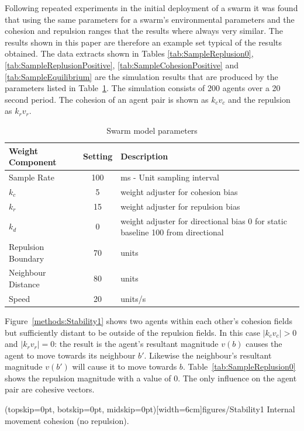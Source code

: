 \documentclass{ieeeaccess}
\begin{document}
Following repeated experiments in the initial deployment of a swarm it was
found that using the same parameters for a swarm's environmental parameters and
the cohesion and repulsion ranges that the results where always very similar.
The results shown in this paper are therefore an example set typical of the
results obtained. The data extracts shown in Tables \ref{tab:SampleReplusion0},
\ref{tab:SampleReplusionPositive}, \ref{tab:SampleCohesionPositive} and
\ref{tab:SampleEquilibrium} are the simulation results that are produced by the
parameters listed in Table~\ref{tab:MetricPhysics1}. The simulation consists of
200 agents over a 20 second period. The cohesion of an agent pair is shown as
$k_cv_c$ and the repulsion as $k_rv_r$.

\begin{table}[H]
\begin{center}
\begin{tabular}{| p{2.5cm} | c | p{3cm} |}
\hline
\bf Weight \bf Component & \bf Setting & \bf Description \\ \hline
Sample Rate & 100 & ms - Unit sampling interval\\  \hline
$k_c$ & 5 & weight adjuster for cohesion bias\\  \hline
$k_r$ & 15 & weight adjuster for repulsion  bias\\  \hline
$k_d$ & 0 & weight adjuster for directional bias 0 for static baseline 100 from directional\\  \hline
Repulsion Boundary & 70 & units\\  \hline
Neighbour Distance & 80 & units\\  \hline
Speed & 20 & units/s\\  \hline
\end{tabular}\caption{Swarm model parameters} \label{tab:MetricPhysics1}
\end{center}
\end{table}

Figure~\ref{methods:Stability1} shows two agents within each other's cohesion
fields but sufficiently distant to be outside of the repulsion fields. In this
case $|k_cv_c| > 0$ and $|k_rv_r| = 0$: the result is the agent's resultant
magnitude $v(b)$ causes the agent to move towards its neighbour $b'$. Likewise
the neighbour's resultant magnitude $v(b')$ will cause it to move towards $b$.
Table~\ref{tab:SampleReplusion0} shows the repulsion magnitude with a value of
0. The only influence on the agent pair are cohesive vectors. 

\Figure[t!](topskip=0pt, botskip=0pt, midskip=0pt)[width=6cm]{figures/Stability1}
{Internal movement cohesion (no repulsion).\label{methods:Stability1}}
\end{document}
